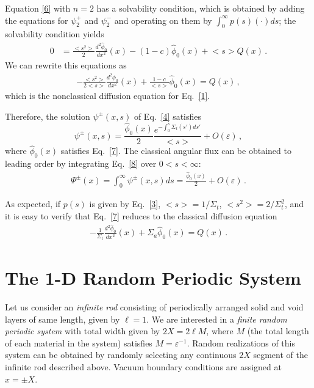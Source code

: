 \documentclass{anstrans}
\newcommand{\bl}{\big<}
\newcommand{\bg}{\big>}
\begin{document}
 Equation \eqref{6} with $n=2$ has a solvability condition, which is obtained by adding the equations for $\psi_2^+$ and $\psi_2^-$ and operating on them by $\int_0^{\infty} p(s) ( \cdot ) ds $; the solvability condition yields
   \begin{align}
      0 &= \frac{\bl s^2\bg}{2}\frac{d^2\hat\phi_0}{dx^2}(x) - (1-c)\hat\phi_0( x) + \bl s\bg Q( x)\,.\nonumber
   \end{align}
We can rewrite this equations as
\begin{align}
      -\frac{\bl s^2\bg}{2\bl s\bg}\frac{d^2\hat\phi_0}{dx^2}(x) + \frac{1-c}{\bl s\bg } \hat\phi_0(x) = Q(x)\,,\label{7}
      \end{align}
which is the nonclassical diffusion equation for Eq.\ \eqref{1}.

Therefore, the solution $\psi^\pm(x, s)$ of Eq.\ \eqref{4} satisfies
   \begin{equation}
      \psi^\pm(x, s) = \frac{\hat\phi_0(x)}{2} \frac{e^{- \int_0^s \Sigma_t( s') ds'}} {\bl s\bg} + O(\varepsilon) \,,\label{8}
   \end{equation} 
where $\hat\phi_0(x)$ satisfies Eq.\ \eqref{7}. The classical angular flux can be obtained to leading order by integrating Eq.\ \eqref{8} over $0 < s < \infty$:
   \begin{align}
   \Psi^\pm(x) = \int_0^{\infty}\psi^\pm(x,s)ds = \frac{\hat\phi_0(x)}{2}+ O(\varepsilon) \,.
   \nonumber
   \end{align}

As expected, if $p(s)$ is given by Eq.\ \eqref{3}, $\bl s\bg = 1/\Sigma_t$, $\bl s^2\bg = 2/\Sigma_t^2$, and it is easy to verify that Eq.\ \eqref{7} reduces to the classical diffusion equation
\begin{align}
 -\frac{1}{\Sigma_t}\frac{d^2\hat\phi_0}{dx^2}(x) + \Sigma_a \hat\phi_0(x) = Q(x)\,.\nonumber
\end{align}

\section{The 1-D Random Periodic System}
Let us consider an \textit{infinite rod} consisting of periodically arranged solid and void layers of same length, given by $\ell=1$.
We are interested in a \textit{finite random periodic system} with total width given by $2X = 2\ell M$, where $M$ (the total length of each material in the system) satisfies $M = \varepsilon^{-1}$. Random realizations of this system can be obtained by randomly selecting any continuous $2X$ segment of the infinite rod described above. Vacuum boundary conditions are assigned at $x=\pm X$. 
\end{document}

